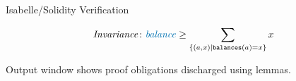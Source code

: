 \documentclass[aspectratio=169]{beamer}
\begin{document}
\begin{frame}{Isabelle/Solidity Verification}
\begin{Example}{}{}
\begin{align*}
		\mathit{Invariance}\colon&\mathit{\color{blue}balance} \geq \sum_{\{(a,x)|\texttt{balances}(a)=x\}} x\\
	\end{align*}
		\begin{center}\vspace{-2mm}
	\end{center}\vspace{-2mm}
Output window shows proof obligations discharged using lemmas.
\end{Example}
\end{frame}
%
%
%
\end{document}
